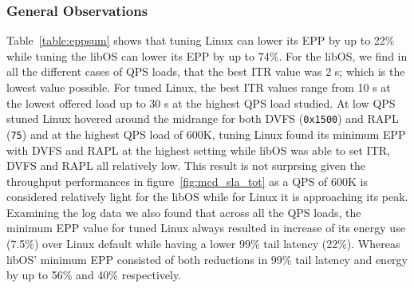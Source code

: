 \subsubsection{General Observations}
Table~\ref{table:eppsum} shows that tuning Linux can lower its EPP by up to 22\% while tuning the libOS can lower its EPP by up to 74\%. For the libOS, we find in all the different cases of QPS loads, that the best ITR value was 2 \micro s; which is the lowest value possible. For tuned Linux, the best ITR values range from 10 \micro s at the lowest offered load up to 30 \micro s at the highest QPS load studied. At low QPS stuned Linux hovered around the midrange for both DVFS (\texttt{0x1500}) and RAPL (\texttt{75}) and at the highest QPS load of 600K, tuning Linux found its minimum EPP with DVFS and RAPL at the highest setting while libOS was able to set ITR, DVFS and RAPL all relatively low. This result is not surprsing given the throughput performances in figure~\ref{fig:mcd_sla_tot} as a QPS of 600K is considered relatively light for the libOS while for Linux it is approaching its peak. Examining the log data we also found that across all the QPS loads, the minimum EPP value for tuned Linux always resulted in increase of its energy use (7.5\%) over Linux default while having a lower 99\% tail latency (22\%). Whereas libOS' minimum EPP consisted of both reductions in 99\% tail latency and energy by up to 56\% and 40\% respectively.

